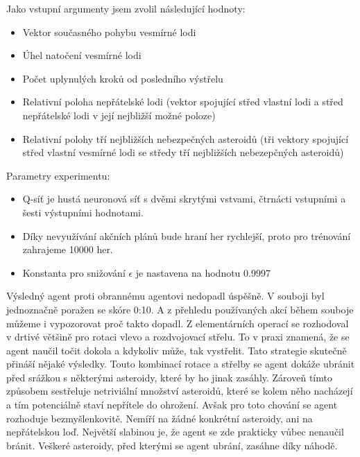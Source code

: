 \par
Jako vstupní argumenty jsem zvolil následující hodnoty:
\begin{itemize}
    \item Vektor současného pohybu vesmírné lodi
    \item Úhel natočení vesmírné lodi
    \item Počet uplynulých kroků od posledního výstřelu
    \item Relativní poloha nepřátelské lodi (vektor spojující střed vlastní lodi a střed nepřátelské lodi v její nejbližší možné poloze)
    \item Relativní polohy tří nejbližších nebezpečných asteroidů (tři vektory spojující střed vlastní vesmírné lodi se středy tří nejbližších nebezepčných asteroidů)
\end{itemize}

Parametry experimentu:
\begin{itemize}
    \item Q-síť je hustá neuronová síť s dvěmi skrytými vstvami, čtrnácti vstupními a šesti výstupními hodnotami.
    \item Díky nevyužívání akčních plánů bude hraní her rychlejší, proto pro trénování zahrajeme 10000 her.
    \item Konstanta pro snižování $\epsilon$ je nastavena na hodnotu 0.9997
\end{itemize}


Výsledný agent proti obrannému agentovi nedopadl úspěšně. V souboji byl jednoznačně poražen se skóre 0:10.
A z přehledu používaných akcí během souboje můžeme i vypozorovat proč takto dopadl. Z elementárních operací se rozhodoval v drtivé většině pro rotaci vlevo a rozdvojovací střelu.
To v praxi znamená, že se agent naučil točit dokola a kdykoliv může, tak vystřelit. Tato strategie skutečně přináší nějaké výsledky.
Touto kombinací rotace a střelby se agent dokáže ubránit před srážkou s některými asteroidy, které by ho jinak zasáhly. Zároveň tímto způsobem sestřeluje netriviální množství asteroidů, které se kolem něho nacházejí a tím potenciálně staví nepřítele do ohrožení.
Avšak pro toto chování se agent rozhoduje bezmyšlenkovitě. 
Nemíří na žádné konkrétní asteroidy, ani na nepřátelskou loď.
Největší slabinou je, že agent se zde prakticky vůbec nenaučil bránit.
Veškeré asteroidy, před kterými se agent ubrání, zasáhne díky náhodě.


